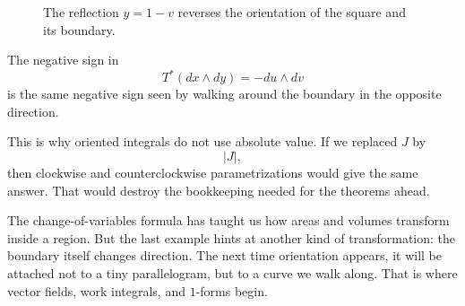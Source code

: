\begin{figure}[h]
\centering
{}
\caption{The reflection \(y=1-v\) reverses the orientation of the square and its
boundary.}
\end{figure}

The negative sign in
\[
    T^*(dx\wedge dy)=-du\wedge dv
\]
is the same negative sign seen by walking around the boundary in the opposite
direction.

This is why oriented integrals do not use absolute value.  If we replaced \(J\) by
\[
    |J|,
\]
then clockwise and counterclockwise parametrizations would give the same answer.
That would destroy the bookkeeping needed for the theorems ahead.

The change-of-variables formula has taught us how areas and volumes transform inside
a region.  But the last example hints at another kind of transformation: the boundary
itself changes direction.  The next time orientation appears, it will be attached not to
a tiny parallelogram, but to a curve we walk along.  That is where vector fields,
work integrals, and \(1\)-forms begin.
